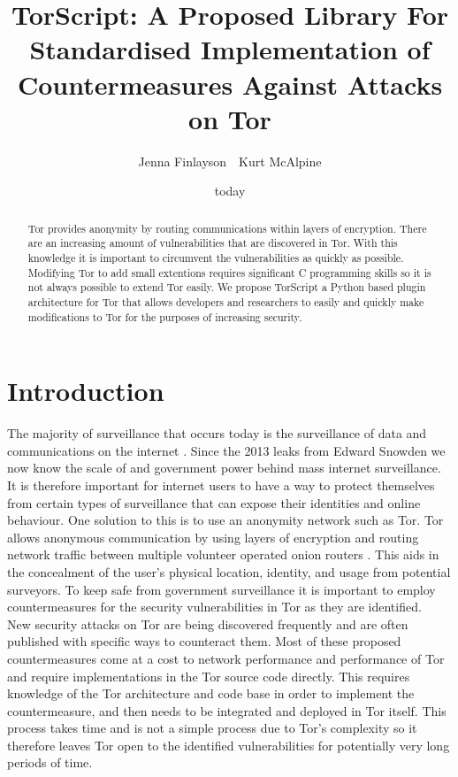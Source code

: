 \documentclass[9pt,technote]{IEEEtran}
\title{TorScript: A Proposed Library For Standardised Implementation of Countermeasures Against Attacks on Tor}
\date{today}
\author{Jenna Finlayson~~Kurt McAlpine}
\begin{document}
 
\maketitle

\begin{abstract}
Tor provides anonymity by routing communications within layers of encryption.
There are an increasing amount of vulnerabilities that are discovered in Tor.
With this knowledge it is important to circumvent the vulnerabilities as quickly
as possible. Modifying Tor to add small extentions requires significant C
programming skills so it is not always possible to extend Tor easily. We propose TorScript a Python based plugin architecture for Tor
that allows developers and researchers to easily and quickly make modifications
to Tor for the purposes of increasing security.
\end{abstract}

\section{Introduction} 
The majority of surveillance that occurs today is the surveillance of data and communications on the internet \cite{diffie2008brave}. Since the 2013 leaks from Edward Snowden we now know the scale of and government power behind mass internet surveillance. It is therefore important for internet users to have a way to protect themselves from certain types of surveillance that can expose their identities and online behaviour. One solution to this is to use an anonymity network such as Tor. Tor allows anonymous communication by using layers of encryption and routing network traffic between multiple volunteer operated onion routers \cite{tor}. This aids in the concealment of the
user's physical location, identity, and usage from potential surveyors. To keep
safe from government surveillance it is important to employ countermeasures for the security vulnerabilities in Tor as they are identified.\\

New security attacks on Tor are being discovered frequently and are often published with specific ways to counteract them. Most of these proposed countermeasures come at a cost to network performance and performance of Tor and require implementations in the Tor source code directly. This requires knowledge of the Tor architecture and code base in order to implement the countermeasure, and then needs to be integrated and deployed in Tor itself. This process takes time and is not a simple process due to Tor's complexity so it therefore leaves Tor open to the identified vulnerabilities for potentially very long periods of time. \\
\end{document}
